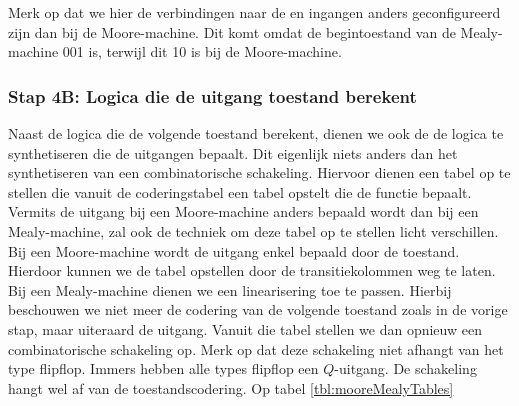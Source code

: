 Merk op dat we hier de verbindingen naar de \clrsin{} en \prsin{} ingangen anders geconfigureerd zijn dan bij de Moore-machine. Dit komt omdat de begintoestand van de Mealy-machine 001 is, terwijl dit 10 is bij de Moore-machine.
\subsubsection{Stap 4B: Logica die de uitgang toestand berekent}
Naast de logica die de volgende toestand berekent, dienen we ook de de logica te synthetiseren die de uitgangen bepaalt. Dit eigenlijk niets anders dan het synthetiseren van een combinatorische schakeling. Hiervoor dienen een tabel op te stellen die vanuit de coderingstabel een tabel opstelt die de functie bepaalt. Vermits de uitgang bij een Moore-machine anders bepaald wordt dan bij een Mealy-machine, zal ook de techniek om deze tabel op te stellen licht verschillen. Bij een Moore-machine wordt de uitgang enkel bepaald door de toestand. Hierdoor kunnen we de tabel opstellen door de transitiekolommen weg te laten. Bij een Mealy-machine dienen we een linearisering toe te passen. Hierbij beschouwen we niet meer de codering van de volgende toestand zoals in de vorige stap, maar uiteraard de uitgang. Vanuit die tabel stellen we dan opnieuw een combinatorische schakeling op. Merk op dat deze schakeling niet afhangt van het type flipflop. Immers hebben alle types flipflop een $Q$-uitgang. De schakeling hangt wel af van de toestandscodering. Op tabel \ref{tbl:mooreMealyTables}
